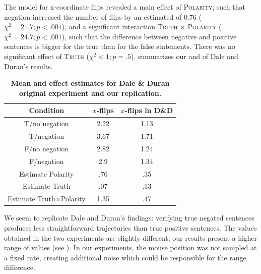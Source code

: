 \documentclass[11pt]{article}
\begin{document}
The model for x-coordinate flips revealed a main effect of \textsc{Polarity}, such that negation increased the number of flips by an estimated of 0.76 ($\chi^{2}=21.7; p<.001$), and a significant interaction \textsc{Truth} $\times$ \textsc{Polarity} ($\chi^{2}=24.7; p<.001$), such that the difference between negative and positive sentences is bigger for the true than for the false statements. There was no significant effect of \textsc{Truth} ($\chi^{2}<1; p=.5$). 
 summarizes our and of Dale and Duran's results. 

\begin{table}[h]
\begin{center}
\begin{tabular}{ccc}
Condition & $x$-flips &  $x$-flips in D\&D \\
\hline
T/no negation & 2.22 & 1.13 \\
T/negation & 3.67 & 1.71 \\
F/no negation & 2.82 & 1.24 \\
F/negation & 2.9 & 1.34 \\
Estimate Polarity & .76 & .35 \\
Estimate Truth & .07 & .13 \\
Estimate Truth$\times$Polarity & 1.35 & .47\\
\end{tabular}
\caption{\textbf{Mean and effect estimates for Dale \& Duran original experiment and our replication.}}
\label{table:negationresults}
\end{center}
\end{table}%

We seem to replicate Dale and Duran's findings: verifying true negated sentences produces less straightforward trajectories than true positive sentences. The values obtained in the two experiments are slightly different; our results present a higher range of values (see ). 
In our experiments, the mouse position was not sampled at a fixed rate, creating additional noise which could be responsible for the range difference. 

\end{document}
